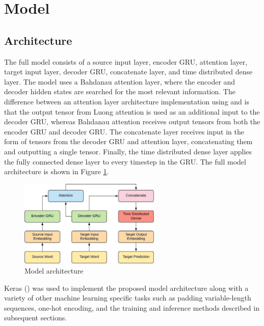 \section{Model}
\label{sec:3-model}

\subsection{Architecture}
The full model consists of a source input layer, encoder \acrshort{GRU}, attention layer, target input layer, decoder \acrshort{GRU}, concatenate layer, and time distributed dense layer.
The model uses a Bahdanau attention layer, where the encoder and decoder hidden states are searched for the most relevant information. The difference between an attention layer architecture implementation using \cite{bahdanau_neural_2016} and \cite{luong_effective_2015} is that the output tensor from Luong attention is used as an additional input to the decoder \acrshort{GRU}, whereas Bahdanau attention receives output tensors from both the encoder \acrshort{GRU} and decoder \acrshort{GRU}.
The concatenate layer receives input in the form of tensors from the decoder \acrshort{GRU} and attention layer, concatenating them and outputting a single tensor. Finally, the time distributed dense layer applies the fully connected dense layer to every timestep in the \acrshort{GRU}. The full model architecture is shown in Figure \ref{fig:model_diagram}.



\begin{figure}[ht!]
\centering
\includegraphics[width=0.6\textwidth]{media/methodology/model_architecture.jpeg}
\captionsetup{justification=centering}
\caption[Diagram of the model architecture]{Model architecture}
\label{fig:model_diagram}
\end{figure}

Keras (\cite{keras_2015}) was used to implement the proposed model architecture along with a variety of other machine learning specific tasks such as padding variable-length sequences, one-hot encoding, and the training and inference methods described in subsequent sections.

